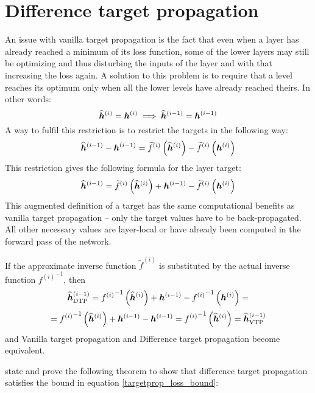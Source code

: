 \section{Difference target propagation}

An issue with vanilla target propagation is the fact that even when a layer has already reached a minimum of its loss function, some of the lower layers may still be optimizing and thus disturbing the inputs of the layer and with that increasing the loss again. A solution to this problem is to require that a level reaches its optimum only when all the lower levels have already reached theirs. In other words:
\[ \widehat{\bm{h}}^{(i)} = \bm{h}^{(i)} \implies \widehat{\bm{h}}^{(i - 1)} = \bm{h}^{(i - 1)} \]
A way to fulfil this restriction is to restrict the targets in the following way:
\[ \widehat{\bm{h}}^{(i - 1)} - \bm{h}^{(i - 1)} = \widetilde{f}^{(i)} \left( \widehat{\bm{h}}^{(i)} \right) - \widetilde{f}^{(i)} \left( \bm{h}^{(i)} \right) \]
This restriction gives the following formula for the layer target:
\begin{equation}\label{difference_targetprop}
	\widehat{\bm{h}}^{(i - 1)} = \widetilde{f}^{(i)} \left( \widehat{\bm{h}}^{(i)} \right) + \bm{h}^{(i - 1)} - \widetilde{f}^{(i)} \left( \bm{h}^{(i)} \right)
\end{equation}
This augmented definition of a target has the same computational benefits as vanilla target propagation -- only the target values have to be back-propagated. All other necessary values are layer-local or have already been computed in the forward pass of the network.

\begin{remark}
	If the approximate inverse function \( \widetilde{f}^{(i)} \) is substituted by the actual inverse function \( {f^{(i)}}^{-1} \), then
	\[ \widehat{\bm{h}}_{\mathrm{DTP}}^{(i - 1)} = {f^{(i)}}^{-1} \left( \widehat{\bm{h}}^{(i)} \right) + \bm{h}^{(i - 1)} - {f^{(i)}}^{-1} \left( \bm{h}^{(i)} \right) = \]
	\[ = {f^{(i)}}^{-1} \left( \widehat{\bm{h}}^{(i)} \right) + \bm{h}^{(i - 1)} - \bm{h}^{(i - 1)} = {f^{(i)}}^{-1} \left( \widehat{\bm{h}}^{(i)} \right) = \widehat{\bm{h}}_{\mathrm{VTP}}^{(i - 1)} \]
	and Vanilla target propagation and Difference target propagation become equivalent.
\end{remark}

\cite{lee_difference_2015} state and prove the following theorem to show that difference target propagation satisfies the bound in equation \ref{targetprop_loss_bound}:

